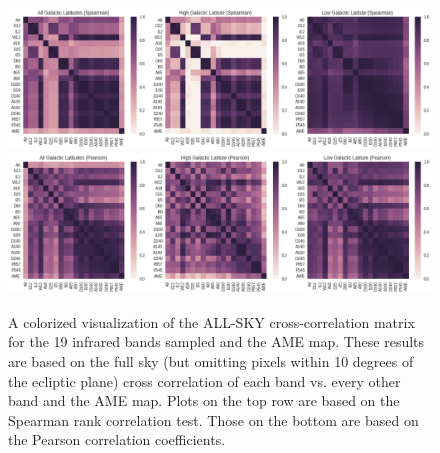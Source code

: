 \documentclass[preprint2,longabstract]{aastex}
\begin{document}
\begin{figure}
\label{fig:AME_IR_crosscorr_allbandsg}
\includegraphics[width=185mm]{../Plots/all_bands_corr_matrix_wAME_spearman.png}
\includegraphics[width=185mm]{../Plots/all_bands_corr_matrix_wAME_pearson.png}
\centering
\caption{A colorized visualization of the ALL-SKY cross-correlation matrix for the 19 infrared bands sampled and the AME map. These results are based on the full sky (but omitting pixels within 10 degrees of the ecliptic plane) cross correlation of each band vs. every other band and the AME map. Plots on the top row are based on the Spearman rank correlation test. Those on the bottom are based on the Pearson correlation coefficients. }
\end{figure}
\end{document}
